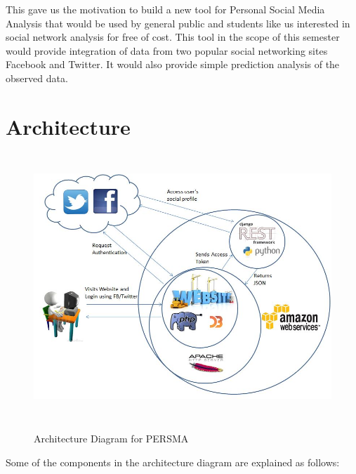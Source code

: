 \documentclass[12pt]{ucthesis}
\newcommand{\captionfonts}{\small\bf\ssp}
\begin{document}
This gave us the motivation to build a new tool for Personal Social Media Analysis that would be used by general public and students like us interested in social network analysis for free of cost. This tool in the scope of this semester would provide integration of data from two popular social networking sites Facebook and Twitter. It would also provide simple prediction analysis of the observed data. 


\section{Architecture}
\label{ch2s2}
\begin{figure}[ht!]
\begin{center}
\includegraphics[height=100mm]{arch.JPG}
\captionfonts
\caption[Architecture Diagram of PERSMA]{Architecture Diagram for PERSMA}
\label{arch}
\end{center}
\end{figure}

Some of the components in the architecture diagram are explained as follows:
\end{document}
